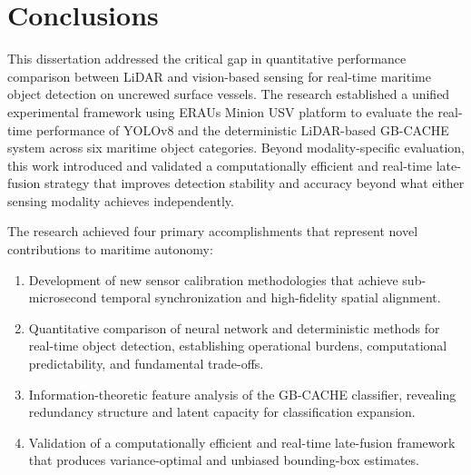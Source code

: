 \documentclass{erauthesis}
\begin{document}


\chapter{Conclusions} \label{chapter_conclusions}

This dissertation addressed the critical gap in quantitative performance comparison between LiDAR and vision-based sensing for real-time maritime object detection on uncrewed surface vessels. The research established a unified experimental framework using ERAUs Minion \ac{USV} platform to evaluate the real-time performance of YOLOv8 and the deterministic LiDAR-based GB-CACHE system across six maritime object categories. Beyond modality-specific evaluation, this work introduced and validated a computationally efficient and real-time late-fusion strategy that improves detection stability and accuracy beyond what either sensing modality achieves independently.

The research achieved four primary accomplishments that represent novel contributions to maritime autonomy:
\begin{enumerate}
    \item Development of new sensor calibration methodologies that achieve sub-microsecond temporal synchronization and high-fidelity spatial alignment.
    \item Quantitative comparison of neural network and deterministic methods for real-time object detection, establishing operational burdens, computational predictability, and fundamental trade-offs.
    \item Information-theoretic feature analysis of the GB-CACHE classifier, revealing redundancy structure and latent capacity for classification expansion.
    \item Validation of a computationally efficient and real-time late-fusion framework that produces variance-optimal and unbiased bounding-box estimates.
\end{enumerate}
\end{document}
